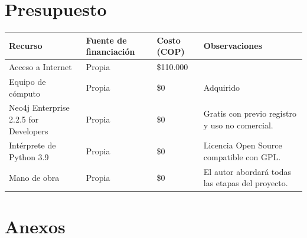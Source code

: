 \documentclass[11pt,letterpaper,oneside]{article}
\begin{document}
	\section{Presupuesto}
	\begin{center}
	\begin{tabular}{ |p{3cm}|p{2cm}|p{1.5cm}|p{3cm}| }
	 \hline
	 \textbf{Recurso} & \textbf{Fuente de financiación} & \textbf{Costo (COP)} & \textbf{Observaciones}\\ 
	 \hline
	 Acceso a Internet & Propia & \$110.000 & \\ \hline
	 Equipo de cómputo & Propia & \$0 & Adquirido\\ \hline
	 Neo4j Enterprise 2.2.5 for Developers & Propia & \$0 & Gratis con previo registro y uso no comercial. \\ \hline
	 Intérprete de Python 3.9 & Propia & \$0 & Licencia Open Source compatible con GPL.
	  \\ \hline
	 Mano de obra & Propia & \$0 & El autor abordará todas las etapas del proyecto.  \\
	 \hline
	\end{tabular}
	\end{center}
	
	\section{Anexos}
	
\end{document}
